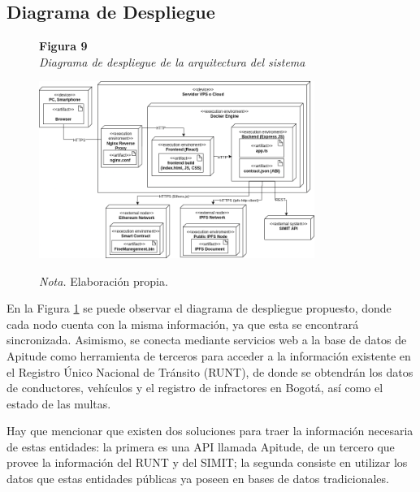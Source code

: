  \subsection{ Diagrama de Despliegue }
\begin{figure}[htbp]
    \begin{flushleft}
        \textbf{Figura 9}\\[2em]
        \textit{Diagrama de despliegue de la arquitectura del sistema}
    \end{flushleft}
    \vspace{1em}
    \centering
    \includegraphics[width=0.8\textwidth]{Images/Despliegue.png}
    \vspace{2em}
    \begin{flushleft}
        \textit{Nota.} Elaboración propia.
    \end{flushleft}
    \label{fig:diagrama_despliegue}
\end{figure}

En la Figura \ref{fig:diagrama_despliegue} se puede observar el diagrama de despliegue propuesto, donde cada nodo cuenta con la misma información, ya que esta se encontrará sincronizada. Asimismo, se conecta mediante servicios web a la base de datos de Apitude como herramienta de terceros para acceder a la información existente en el Registro Único Nacional de Tránsito (RUNT), de donde se obtendrán los datos de conductores, vehículos y el registro de infractores en Bogotá, así como el estado de las multas.

Hay que mencionar que existen dos soluciones para traer la información necesaria de estas entidades: la primera es una API llamada Apitude, de un tercero que provee la información del RUNT y del SIMIT; la segunda consiste en utilizar los datos que estas entidades públicas ya poseen en bases de datos tradicionales. 

